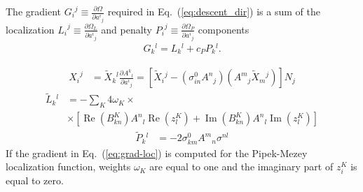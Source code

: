 \documentclass[aps,prl,reprint,amsmath,amssymb]{revtex4-1}
\begin{document}
The gradient ${G_i}^j \equiv \frac{\partial \Omega}{\partial {a^i}_j}$  required in Eq.~(\ref{eq:descent_dir}) is a sum of the localization ${L_i}^j \equiv \frac{\partial \Omega_L}{\partial {a^i}_j}$ and penalty ${P_i}^j \equiv \frac{\partial \Omega_P}{\partial {a^i}_j}$ components
%
\begin{equation} \label{eq:grad}
\begin{split}
G{_k}^{l} = L{_k}^{l} + c_P P{_k}^{l}.
\end{split}
\end{equation}
%

%
\begin{equation} \label{eq:grad-convert}
\begin{split}
{X_i}^j & = \tilde{X}{_k}^l \frac{\partial {A^k}_l}{\partial {a^i}_j} = \left[ \tilde{X}{_i}^j - ( \sigma_{in}^0 {A^n}_j ) ( {A^m}_j \tilde{X}{_m}^j ) \right] N_j 
\end{split}
\end{equation}
%
\begin{equation} \label{eq:grad-loc}
\begin{split}
\tilde{L}{_k}^l & = - \sum_K {4 \omega_K} \times \\ 
&\times \left[  \operatorname{Re}(B^{K}_{kn}) {A^{n}}_{l} \operatorname{Re}(z_{l}^{K}) + \operatorname{Im}(B^{K}_{kn}) {A^{n}}_{l} \operatorname{Im}(z_{l}^{K}) \right]
\end{split}
\end{equation}
%
\begin{equation} \label{eq:grad-pen}
\begin{split}
\tilde{P}{_k}^l & = -2 \sigma_{km}^0 {A^m}_n \sigma^{nl} 
\end{split}
\end{equation}
%
If the gradient in Eq.~(\ref{eq:grad-loc}) is computed for the Pipek-Mezey localization function, weights $\omega_K$ are equal to one and the imaginary part of $z_{i}^{K}$ is equal to zero.
\end{document}

